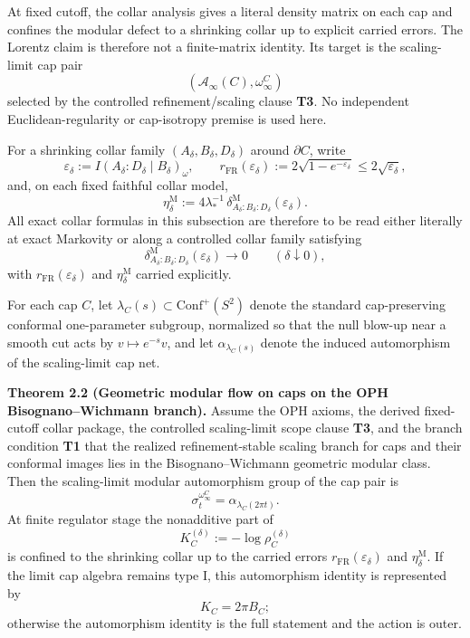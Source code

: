 At fixed cutoff, the collar analysis gives a literal density matrix on each cap and confines the modular defect to a shrinking collar up to explicit carried errors. The Lorentz claim is therefore not a finite-matrix identity. Its target is the scaling-limit cap pair
\[
(\mathcal A_\infty(C),\omega_\infty^C)
\]
selected by the controlled refinement/scaling clause \textbf{T3}. No independent Euclidean-regularity or cap-isotropy premise is used here.

For a shrinking collar family \((A_\delta,B_\delta,D_\delta)\) around \(\partial C\), write
\[
\varepsilon_\delta:=I(A_\delta:D_\delta\mid B_\delta)_\omega,
\qquad
r_{\mathrm{FR}}(\varepsilon_\delta):=
2\sqrt{1-e^{-\varepsilon_\delta}}
\le 2\sqrt{\varepsilon_\delta},
\]
and, on each fixed faithful collar model,
\[
\eta_\delta^{\mathrm M}
:=
4\lambda_\ast^{-1}\,
\delta^{\mathrm M}_{A_\delta:B_\delta:D_\delta}(\varepsilon_\delta).
\]
All exact collar formulas in this subsection are therefore to be read either literally at exact Markovity or along a controlled collar family satisfying
\[
\delta^{\mathrm M}_{A_\delta:B_\delta:D_\delta}(\varepsilon_\delta)\to 0
\qquad(\delta\downarrow 0),
\]
with \(r_{\mathrm{FR}}(\varepsilon_\delta)\) and \(\eta_\delta^{\mathrm M}\) carried explicitly.

For each cap \(C\), let \(\lambda_C(s)\subset \mathrm{Conf}^+(S^2)\) denote the standard cap-preserving conformal one-parameter subgroup, normalized so that the null blow-up near a smooth cut acts by \(v\mapsto e^{-s}v\), and let \(\alpha_{\lambda_C(s)}\) denote the induced automorphism of the scaling-limit cap net.

\textbf{Theorem 2.2 (Geometric modular flow on caps on the OPH Bisognano--Wichmann branch).} Assume the OPH axioms, the derived fixed-cutoff collar package, the controlled scaling-limit scope clause \textbf{T3}, and the branch condition \textbf{T1} that the realized refinement-stable scaling branch for caps and their conformal images lies in the Bisognano--Wichmann geometric modular class. Then the scaling-limit modular automorphism group of the cap pair is
\[
\sigma_t^{\omega_\infty^C}
=
\alpha_{\lambda_C(2\pi t)}.
\]
At finite regulator stage the nonadditive part of
\[
K_C^{(\delta)}:=-\log \rho_C^{(\delta)}
\]
is confined to the shrinking collar up to the carried errors \(r_{\mathrm{FR}}(\varepsilon_\delta)\) and \(\eta_\delta^{\mathrm M}\). If the limit cap algebra remains type I, this automorphism identity is represented by
\[
K_C=2\pi B_C;
\]
otherwise the automorphism identity is the full statement and the action is outer.

